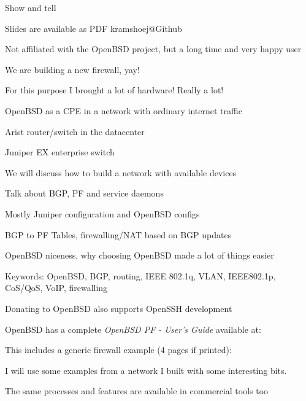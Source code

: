 \documentclass[Screen16to9,17pt]{foils}
\begin{document}
{Show and tell}

\vskip 1cm
\centerline{\footnotesize Slides are available as PDF kramshoej@Github}



\centerline{\footnotesize Not affiliated with the OpenBSD project, but a long time and very happy user}


We are building a new firewall, yay!

For this purpose I brought a lot of hardware! Really a lot!
\begin{list2}
\item OpenBSD as a CPE in a network with ordinary internet traffic
\item Arist router/switch in the datacenter
\item Juniper EX enterprise switch
\item We will discuss how to build a network with available devices
\item Talk about BGP, PF and service daemons
\item Mostly Juniper configuration and OpenBSD configs
\item BGP to PF Tables, firewalling/NAT based on BGP updates
\item OpenBSD niceness, why choosing OpenBSD made a lot of things easier
\item Keywords:
OpenBSD, BGP, routing, IEEE 802.1q, VLAN, IEEE802.1p, CoS/QoS, VoIP, firewalling
\end{list2}



\centerline{Donating to OpenBSD also supports OpenSSH development}

OpenBSD has a complete \emph{OpenBSD PF - User's Guide} available at:\\

This includes a generic firewall example (4 pages if printed):\\

I will use some examples from a network I built with some interesting bits.

The same processes and features are available in commercial tools too


\end{document}
